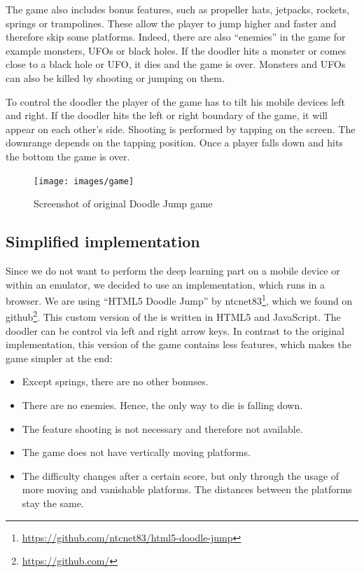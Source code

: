\documentclass[a4paper,12pt,pagesize,headsepline,bibtotoc,titlepage,abstracton]{scrartcl}
\newcommand{\quot}[1]{{``#1''}}
\begin{document}
The game also includes bonus features, such as propeller hats, jetpacks, rockets, springs or trampolines. These allow the player to jump higher and faster and therefore skip some platforms. Indeed, there are also \quot{enemies} in the game for example monsters, UFOs or black holes. If the doodler hits a monster or comes close to a black hole or UFO, it dies and the game is over. Monsters and UFOs can also be killed by shooting or jumping on them.

To control the doodler the player of the game has to tilt his mobile devices left and right. If the doodler hits the left or right boundary of the game, it will appear on each other's side. Shooting is performed by tapping on the screen. The downrange depends on the tapping position. Once a player falls down and hits the bottom the game is over.

\begin{figure}[h]
\begin{center}
\texttt{[image: images/game]}\\
\caption{Screenshot of original Doodle Jump game}
\label{abb:doodlejumpgame}
\end{center}
\end{figure}

\subsection{Simplified implementation}

Since we do not want to perform the deep learning part on a mobile device or within an emulator, we decided to use an implementation, which runs in a browser. We are using \quot{HTML5 Doodle Jump} by ntcnet83\footnote{\url{https://github.com/ntcnet83/html5-doodle-jump}}, which we found on github\footnote{\url{https://github.com/}}. This custom version of the is written in HTML5 and JavaScript. The doodler can be control via left and right arrow keys. In contrast to the original implementation, this version of the game contains less features, which makes the game simpler at the end:
\begin{itemize}
\item Except springs, there are no other bonuses.
\item There are no enemies. Hence, the only way to die is falling down.
\item The feature shooting is not necessary and therefore not available.
\item The game does not have vertically moving platforms.
\item The difficulty changes after a certain score, but only through the usage of more moving and vanishable platforms. The distances between the platforms stay the same.
\end{itemize}
\end{document}
